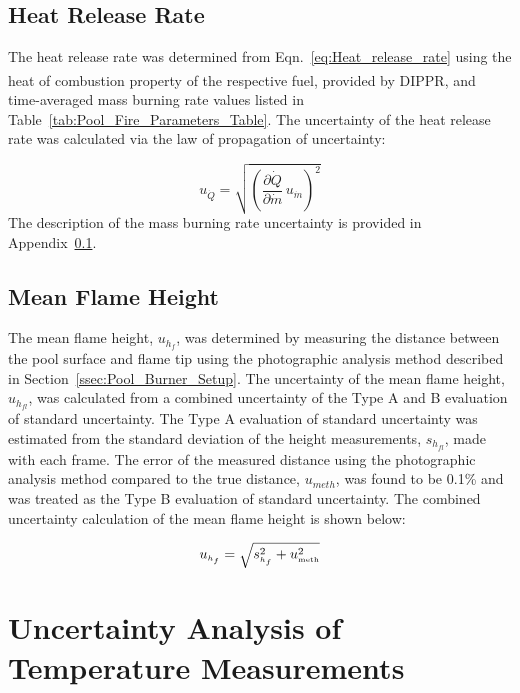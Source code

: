 \documentclass[12pt]{article}
\begin{document}
\subsection{Heat Release Rate}
\label{ssec:Heat_Release_Rate}
The heat release rate was determined from Eqn.~\ref{eq:Heat_release_rate} using the heat of combustion property of the respective fuel, provided by DIPPR\textsuperscript{\textregistered}, and time-averaged mass burning rate values listed in Table~\ref{tab:Pool_Fire_Parameters_Table}. The uncertainty of the heat release rate was calculated via the law of propagation of uncertainty:

\begin{equation}
\label{eq:heat_release_rate_uncertainty}
u_{\scriptscriptstyle \dot{Q}} = \sqrt{{\left(\frac{\partial \dot{Q}}{\partial \dot{m}}\,u_{\scriptscriptstyle \dot{m}} \right)}^2}
\end{equation}
The description of the mass burning rate uncertainty is provided in Appendix~\ref{ssec:Heat_Release_Rate}.

\subsection{Mean Flame Height}
\label{ssec:Mean_Flame_Height}
The mean flame height, $u_{h_{f}}$, was determined by measuring the distance between the pool surface and flame tip using the photographic analysis method described in Section~\ref{ssec:Pool_Burner_Setup}. The uncertainty of the mean flame height, $u_{\scriptscriptstyle h_{fl}}$, was calculated from a combined uncertainty of the Type A and B evaluation of standard uncertainty. The Type A evaluation of standard uncertainty was estimated from the standard deviation of the height measurements, $s_{\scriptscriptstyle h_{fl}}$, made with each frame. The error of the measured distance using the photographic analysis method compared to the true distance, $u_{\scriptscriptstyle meth}$,  was found to be 0.1\% and was treated as the Type B evaluation of standard uncertainty. The combined uncertainty calculation of the mean flame height is shown below:

\begin{equation}
\label{eq:mean_flame_height}
u_{\scriptscriptstyle h_{f}} = \sqrt{s_{\scriptscriptstyle{h_{f}}}^2+u_{\rm \scriptscriptstyle meth}^2}
\end{equation}

\pagebreak

\section{Uncertainty Analysis of Temperature Measurements}\label{sec:Uncertainty_Temperature_Measurements}
\end{document}

